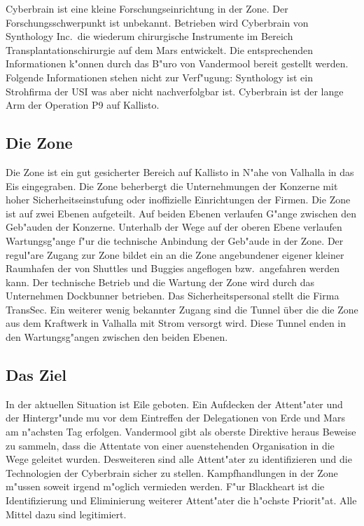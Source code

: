 \newcommand{\ml}{\pinyin{Mailin2}}

Cyberbrain ist eine kleine Forschungseinrichtung in der Zone. Der Forschungsschwerpunkt ist unbekannt. Betrieben wird Cyberbrain von Synthology Inc.~die wiederum chirurgische Instrumente im Bereich Transplantationschirurgie auf dem Mars entwickelt. Die entsprechenden Informationen k"onnen durch das B"uro von Vandermool bereit gestellt werden. Folgende Informationen stehen nicht zur Verf"ugung: Synthology ist ein Strohfirma der USI was aber nicht nachverfolgbar ist. Cyberbrain ist der lange Arm der Operation P9 auf Kallisto.

\subsection{Die Zone}
Die Zone ist ein gut gesicherter Bereich auf Kallisto in N"ahe von Valhalla in das Eis eingegraben. Die Zone beherbergt die Unternehmungen der Konzerne mit hoher Sicherheitseinstufung oder inoffizielle Einrichtungen der Firmen. Die Zone ist auf zwei Ebenen aufgeteilt. Auf beiden Ebenen verlaufen G"ange zwischen den Geb"auden der Konzerne. Unterhalb der Wege auf der oberen Ebene verlaufen Wartungsg"ange f"ur die technische Anbindung der Geb"aude in der Zone. Der regul"are Zugang zur Zone bildet ein an die Zone angebundener eigener kleiner Raumhafen der von Shuttles und Buggies angeflogen bzw.~angefahren werden kann. Der technische Betrieb und die Wartung der Zone wird durch das Unternehmen Dockbunner betrieben. Das Sicherheitspersonal stellt die Firma TransSec. Ein weiterer wenig bekannter Zugang sind die Tunnel über die die Zone aus dem Kraftwerk in Valhalla mit Strom versorgt wird. Diese Tunnel enden in den Wartungsg"angen zwischen den beiden Ebenen.

\subsection{Das Ziel} 
In der aktuellen Situation ist Eile geboten. Ein Aufdecken der Attent"ater und der Hintergr"unde mu\3 vor dem Eintreffen der Delegationen von Erde und Mars am n"achsten Tag erfolgen. Vandermool gibt als oberste Direktive heraus Beweise zu sammeln, dass die Attentate von einer au\3enstehenden Organisation in die Wege geleitet wurden. Desweiteren sind alle Attent"ater zu identifizieren und die Technologien der Cyberbrain sicher zu stellen. Kampfhandlungen in der Zone m"ussen soweit irgend m"oglich vermieden werden. F"ur Blackheart ist die Identifizierung und Eliminierung weiterer Attent"ater die h"ochste Priorit"at. Alle Mittel dazu sind legitimiert. 

